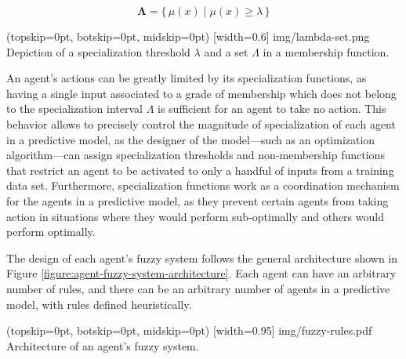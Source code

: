 \documentclass{ieeeaccess}
\begin{document}
\begin{equation}
  \label{equation:activation-interval}
  \bm{\Lambda} = \{\,\mu(x) \mid \mu(x) \geq \lambda \,\}
\end{equation}

\Figure[](topskip=0pt, botskip=0pt, midskip=0pt)
[width=0.6\linewidth]
{img/lambda-set.png}
{Depiction of a specialization threshold $\lambda$ and a set $\Lambda$ in a membership function.
  \label{figure:activation-threshold}}

An agent's actions can be greatly limited by its specialization functions, as having a single input associated to a grade of membership which does not belong to the specialization interval $\Lambda$ is sufficient for an agent to take no action. This behavior allows to precisely control the magnitude of specialization of each agent in a predictive model, as the designer of the model---such as an optimization algorithm---can assign specialization thresholds and non-membership functions that restrict an agent to be activated to only a handful of inputs from a training data set. Furthermore, specialization functions work as a coordination mechanism for the agents in a predictive model, as they prevent certain agents from taking action in situations where they would perform sub-optimally and others would perform optimally.

The design of each agent's fuzzy system follows the general
architecture shown in Figure
\ref{figure:agent-fuzzy-system-architecture}. Each agent can have an
arbitrary number of rules, and there can be an arbitrary number of
agents in a predictive model, with rules defined heuristically.

\Figure[](topskip=0pt, botskip=0pt, midskip=0pt)
[width=0.95\linewidth]
{img/fuzzy-rules.pdf}
{Architecture of an agent's fuzzy system.
  \label{figure:agent-fuzzy-system-architecture}}
\end{document}

